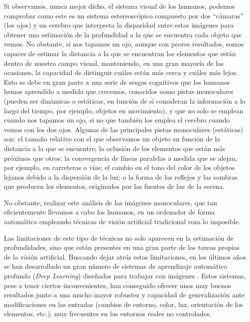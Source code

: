 Si observamos, nunca mejor dicho, el sistema visual de los humanos, podemos comprobar como este es un sistema estereoscópico compuesto por dos  ``cámaras''  (los ojos) y un cerebro que interpreta la disparidad entre estas imágenes para obtener una estimación de la profundidad a la que se encuentra cada objeto que vemos. No obstante, si nos tapamos un ojo, aunque con peores resultados, somos capaces de estimar la distancia a la que se encuentran los elementos que están dentro de nuestro campo visual, manteniendo, en una gran mayoría de las ocasiones, la capacidad de distinguir cuáles están más cerca y cuáles más lejos. Esto se debe en gran parte a una serie de sesgos cognitivos que los humanos hemos aprendido a medida que crecemos, conocidos como pistas monoculares (pueden ser dinámicas o estáticas, en función de si consideran la información a lo largo del tiempo, por ejemplo, objetos en movimiento), y que no solo se emplean cuando nos tapamos un ojo, si no que también los emplea el cerebro cuando vemos con los dos ojos. Algunas de las principales pistas monoculares (estáticas) \cite{Kalloniatis2005-pc} son: el tamaño relativo con el que observamos un objeto en función de la distancia a la que se encuentre; la oclusión de los elementos que están más próximos que otros; la convergencia de líneas paralelas a medida que se alejan, por ejemplo, en carreteras o vías; el cambio en el tono del color de los objetos lejanos debido a la dispersión de la luz; o la forma de los reflejos y las sombras que producen los elementos, originados por las fuentes de luz de la escena.

No obstante, realizar este análisis de las imágenes monoculares, que tan eficientemente llevamos a cabo los humanos, en un ordenador de forma automática empleando técnicas de visión artificial tradicional roza lo imposible. 

Las limitaciones de este tipo de técnicas no solo aparecen en la estimación de profundidades, sino que están presentes en una gran parte de las tareas propias de la visión artificial. Buscando dejar atrás estas limitaciones, en los últimos años se han desarrollado un gran número de sistemas de aprendizaje automático profundo (\textit{Deep Learning}) diseñados para trabajar con imágenes \cite{alexnet, yolov3, unet}. Estos sistemas, pese a tener ciertos inconvenientes, han conseguido ofrecer unos muy buenos resultados junto a una mucho mayor robustez y capacidad de generalización ante modificaciones en las entradas (cambios de entorno, color, luz, orientación de los elementos, etc.), muy frecuentes en los entornos reales no controlados.

